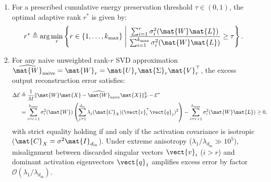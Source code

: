 \begin{theorem}
\begin{enumerate}
    \begin{equation}
    \mathcal{E}^* = \sum_{i=r+1}^{k_{\max}} \sigma_i^2(\widetilde{\mat{W}}) = \sum_{i=r+1}^{k_{\max}} \sigma_i^2(\mat{W} \mat{L}).
    \label{eq:thm1_minimal_error}
    \end{equation}
    \item For a prescribed cumulative energy preservation threshold $\tau \in (0, 1)$, the optimal adaptive rank $r^*$ is given by:
    \begin{equation}
    r^* \triangleq \arg\min_{r} \left\{ r \in \{1, \dots, k_{\max}\} \;\middle|\; \frac{\sum_{i=1}^r \sigma_i^2(\mat{W} \mat{L})}{\sum_{i=1}^{k_{\max}} \sigma_i^2(\mat{W} \mat{L})} \ge \tau \right\}.
    \label{eq:thm1_energy_threshold}
    \end{equation}
    \item For any naive unweighted rank-$r$ SVD approximation $\widehat{\mat{W}}_{\text{naive}} = \mat{W}_r = \mat{U}_r \mat{\Sigma}_r \mat{V}_r^\top$, the excess output reconstruction error satisfies:
    \begin{align}
    \Delta \mathcal{E} &\triangleq \frac{1}{M} \| \mat{W} \mat{X} - \widehat{\mat{W}}_{\text{naive}} \mat{X} \|_F^2 - \mathcal{E}^* \nonumber \\
    &= \sum_{i=r+1}^{k_{\max}} \sigma_i^2(\mat{W}) \left( \sum_{j=1}^{d_{\text{in}}} \lambda_j(\mat{C}_X) (\vect{v}_i^\top \vect{q}_j)^2 \right) - \sum_{i=r+1}^{k_{\max}} \sigma_i^2(\mat{W}\mat{L}) \ge 0,
    \label{eq:thm1_excess_error}
    \end{align}
    with strict equality holding if and only if the activation covariance is isotropic ($\mat{C}_X = \sigma^2 \mat{I}_{d_{\text{in}}}$). Under extreme anisotropy ($\lambda_1 / \lambda_{d_{\text{in}}} \gg 10^5$), misalignment between discarded singular vectors $\vect{v}_i$ ($i > r$) and dominant activation eigenvectors $\vect{q}_1$ amplifies excess error by factor $\mathcal{O}(\lambda_1 / \lambda_{d_{\text{in}}})$.
\end{enumerate}
\end{theorem}

